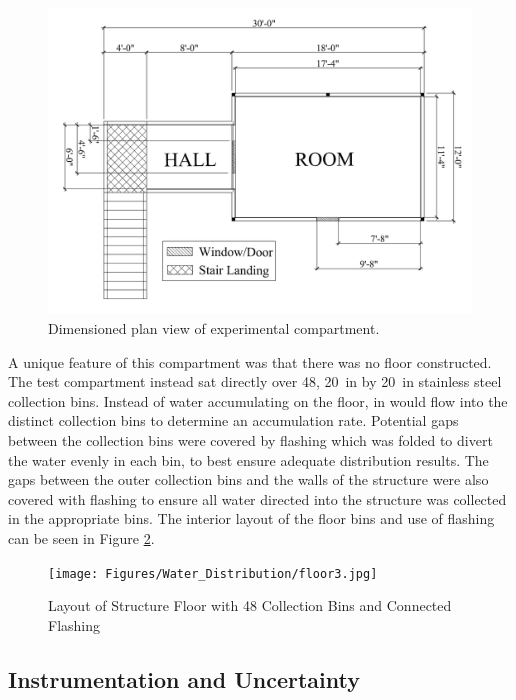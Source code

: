 \documentclass[12pt,oneside]{book}
\begin{document}
\begin{figure}[!ht]
	\centering
	\includegraphics[width=\columnwidth]{Figures/Water_Distribution/ADDtopdownviewtext}
	\caption[Dimensioned Plan View of Experimental Compartment]{Dimensioned plan view of experimental compartment.}
	\label{fig:ADD_Top_View}
\end{figure}

\clearpage

A unique feature of this compartment was that there was no floor constructed. The test compartment instead sat directly over 48, 20~in by 20~in stainless steel collection bins. Instead of water accumulating on the floor, in would flow into the distinct collection bins to determine an accumulation rate. Potential gaps between the collection bins were covered by flashing which was folded to divert the water evenly in each bin, to best ensure adequate distribution results. The gaps between the outer collection bins and the walls of the structure were also covered with flashing to ensure all water directed into the structure was collected in the appropriate bins. The interior layout of the floor bins and use of flashing can be seen in Figure \ref{fig:ADD_Flashing}. 

\begin{figure}[!ht]
	\centering
	\texttt{[image: Figures/Water\_Distribution/floor3.jpg]}
	\caption{Layout of Structure Floor with 48 Collection Bins and Connected Flashing}
	\label{fig:ADD_Flashing}
\end{figure}

\subsection{Instrumentation and Uncertainty}
\label{sec:add_instrumentation}
\end{document}
